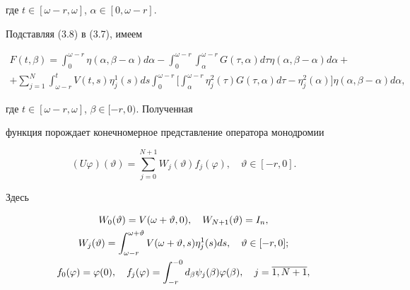 где $t \in[\omega-r, \omega]$, $\alpha \in[0, \omega-r]$.


Подставляя (3.8) в (3.7), имеем


\begin{multline*}


F(t, \beta) =


\int_{0}^{\omega-r} \eta(\alpha, \beta- \alpha) d \alpha-


 \int_{0}^{\omega-r} \int_{\alpha}^{\omega-r}G(\tau, \alpha) d \tau


 \eta(\alpha, \beta- \alpha) d \alpha+ \\


%


+ \sum_{j=1}^{N} \int_{\omega-r}^{t} V(t,s) \eta_{j}^{1}(s) ds


 \int_{0}^{\omega-r}\bigg[\int_{\alpha}^{\omega-r} \eta_{j}^{2}(\tau)


 G(\tau, \alpha) d \tau- \eta_{j}^{2}(\alpha)\bigg]


\eta(\alpha, \beta- \alpha) d \alpha, 


\end{multline*}


где $ t \in[\omega-r, \omega]$, $\beta \in[-r,0)$. Полученная


функция порождает конечномерное представление оператора монодромии


$$


(U \varphi)(\vartheta) = \sum_{j=0}^{N+1}W_{j}(\vartheta)


f_{j}(\varphi),\quad \vartheta \in[-r,0].


$$


Здесь


\begin{gather}


W_{0}(\vartheta) = V(\omega+ \vartheta,0),\quad


W_{N+1}(\vartheta) =I_{n},\notag \\


W_{j}(\vartheta) =


\int_{\omega-r}^{\omega+ \vartheta} V(\omega+ \vartheta,s)


\eta_{j}^{1}(s) ds, \quad \vartheta \in[-r,0]; \\


f_{0}(\varphi) = \varphi(0), \quad


f_{j}(\varphi) = \int_{-r}^{-0}d_{\beta}


\psi_{j}(\beta) \varphi(\beta), \quad j= \overline{1,N+1}, \notag


\end{gather}


